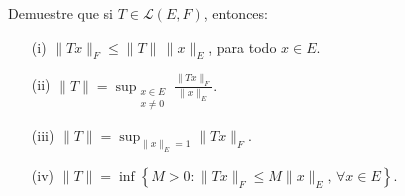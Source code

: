 Demuestre que si $T \in \mathcal{L}(E, F)$, entonces:

\begin{enumerate}
    \item[(i)] $\|T x\|_F \leq \|T\| \, \|x\|_E$, para todo $x \in E$.
    
    \item[(ii)] $
    \|T\| = \displaystyle\sup_{\substack{x \in E \\ x \neq 0}} \frac{\|T x\|_F}{\|x\|_E}.$
    
    
    \item[(iii)] 
    $
    \|T\| = \displaystyle\sup_{\|x\|_E = 1} \|T x\|_F.
    $
    
    \item[(iv)] 
    $
    \|T\| = \inf \left\{ M > 0 : \|T x\|_F \leq M \|x\|_E, \, \forall x \in E \right\}.
    $
\end{enumerate}
